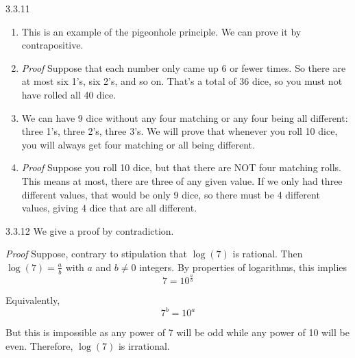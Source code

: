 \documentclass[11pt,]{book}
\makeatletter
\theoremstyle{ptxplainnotitle}
\theoremstyle{ptxplaintitle}
\renewcommand*{\proofname}{Proof}
\renewenvironment{proof}[1][\proofname]{\par
  \pushQED{\qed}%
  \normalfont \topsep6\p@\@plus6\p@\relax
  \trivlist
  \item\relax
    {\itshape
    #1\@addpunct{.}}\hspace\labelsep\ignorespaces
}{%
  \popQED\endtrivlist\@endpefalse
}
\theoremstyle{ptxdefinitionnotitle}
\theoremstyle{ptxdefinitiontitle}
\theoremstyle{ptxdefinitionnotitle}
\theoremstyle{ptxdefinitiontitle}
\theoremstyle{ptxdefinitionnotitle}
\theoremstyle{ptxdefinitiontitle}
\theoremstyle{ptxdefinitiontitlenonumber}
\theoremstyle{ptxdefinitiontitlenonumber}
\numberwithin{equation}{chapter}
\makeatother
\begin{document}
\begin{divisionexercise}{3.3.11}
\textbf{}\hypertarget{p-2426}{}%
\leavevmode%
\begin{enumerate}[label=(\alph*)]
\item\hypertarget{li-1155}{}\hypertarget{p-2427}{}%
This is an example of the pigeonhole principle. We can prove it by contrapositive.%
\begin{proof}\hypertarget{proof-36}{}
\hypertarget{p-2428}{}%
Suppose that each number only came up 6 or fewer times. So there are at most six 1's, six 2's, and so on. That's a total of 36 dice, so you must not have rolled all 40 dice.%
\end{proof}
\item\hypertarget{li-1156}{}\hypertarget{p-2429}{}%
We can have 9 dice without any four matching or any four being all different: three 1's, three 2's, three 3's. We will prove that whenever you roll 10 dice, you will always get four matching or all being different.%
\begin{proof}\hypertarget{proof-37}{}
\hypertarget{p-2430}{}%
Suppose you roll 10 dice, but that there are NOT four matching rolls. This means at most, there are three of any given value. If we only had three different values, that would be only 9 dice, so there must be 4 different values, giving 4 dice that are all different.%
\end{proof}
\end{enumerate}
%
\end{divisionexercise}%
\begin{divisionexercise}{3.3.12}
\textbf{}\hypertarget{p-2432}{}%
We give a proof by contradiction.%
\begin{proof}\hypertarget{proof-38}{}
\hypertarget{p-2433}{}%
Suppose, contrary to stipulation that \(\log(7)\) is rational. Then \(\log(7) = \frac{a}{b}\) with \(a\) and \(b \ne 0\) integers. By properties of logarithms, this implies%
\begin{equation*}
7 = 10^{\frac{a}{b}}
\end{equation*}
%
\par
\hypertarget{p-2434}{}%
Equivalently,%
\begin{equation*}
7^b = 10^a
\end{equation*}
%
\par
\hypertarget{p-2435}{}%
But this is impossible as any power of 7 will be odd while any power of 10 will be even.  Therefore, \(\log(7)\) is irrational.%
\end{proof}
\end{divisionexercise}%
\end{document}
